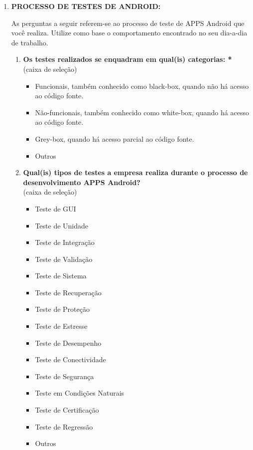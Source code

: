 \begin{enumerate}[label=\bf A\arabic*,leftmargin=1.8cm]
\begin{enumerate}[label= \arabic*]
     \end{enumerate}
     
     
    
     \item \textbf{PROCESSO DE TESTES DE  ANDROID:}
     
     
     As perguntas a seguir referem-se ao processo de teste de \ac{APPS} Android que você realiza. Utilize como base o comportamento encontrado no seu dia-a-dia de trabalho.
     
     \begin{enumerate}[label= \arabic*]
     
     \item \textbf{Os testes realizados se enquadram em qual(is) categorias: *}\\
    (caixa de seleção)
     \begin{itemize}
         \item Funcionais, também conhecido como black-box, quando não há acesso ao código fonte.
         \item Não-funcionais, também conhecido como white-box, quando há acesso ao código fonte.
         \item Grey-box, quando há acesso parcial ao código fonte.
         \item Outros
     \end{itemize}
     
    \item \textbf{Qual(is) tipos de testes a empresa realiza durante o processo de desenvolvimento \ac{APPS} Android?}\\
    (caixa de seleção)
    \begin{itemize}
        \item Teste de GUI
        \item Teste de Unidade
        \item Teste de Integração
        \item Teste de Validação
        \item Teste de Sistema
        \item Teste de Recuperação
        \item Teste de Proteção
        \item Teste de Estresse
        \item Teste de Desempenho
        \item Teste de Conectividade
        \item Teste de Segurança
        \item Teste em Condições Naturais
        \item Teste de Certificação
        \item Teste de Regressão
        \item Outros
    \end{itemize}
     

\end{enumerate}
\end{enumerate}
